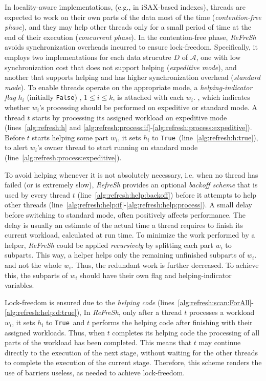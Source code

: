 \documentclass[a4paper,11pt,twoside,openany]{book}
\newcommand{\True}{\mbox{\texttt{True}}}
\newcommand{\False}{\mbox{\texttt{False}}}
\begin{document}
In locality-aware implementations, (e.g., in iSAX-based indexes), threads are expected to work
on their own parts of the data most of the time ({\em contention-free phase}), and they
may help other threads only for a small period of time at the end of their execution
({\em concurrent phase}).
In the contention-free phase, \textit{ReFreSh} avoids synchronization overheads incurred to
ensure lock-freedom. 
Specifically, it employs two implementations for each data strucutre $D$ of  $\mathcal{A}$,
one with low synchronization cost that does not support helping ({\em expeditive mode}),
and another that supports helping and has higher synchronization overhead ({\em standard mode}).  
To enable threads operate on the appropriate mode,  a {\em helping-indicator flag} $h_i$ 
(initially \False) , $1 \leq i \leq k$, is attached with each $w_i$. , which indicates whether 
$w_i$'s processing should be performed on expeditive or standard mode.
% 
A thread $t$ starts by processing its assigned workload 
on expeditive mode (lines~\ref{alg:refresh:h} and \ref{alg:refresh:process:if}-\ref{alg:refresh:process:expeditive}).
Before $t$ starts helping some part $w_i$, it sets $h_i$ to \True\ (line~\ref{alg:refresh:h:true}),
to alert $w_i$'s owner thread to start running on standard mode (line~\ref{alg:refresh:process:expeditive}).

To avoid helping whenever it is not absolutely necessary, i.e. when no thread has
failed (or is extremely slow), \textit{RefreSh} provides an optional {\em backoff scheme} that is used
by every thread $t$ (line~\ref{alg:refresh:help:backoff}) 
before it attempts to help other threads (line~\ref{alg:refresh:help:if}-\ref{alg:refresh:help:process}).
A small delay before switching to standard mode, often positively affects performance.
The delay is usually an estimate of the actual time a thread requires to finish its
current workload, calculated at run time.
% 
To minimize the work performed by a helper, \textit{ReFreSh} could
be applied  {\em recursively} by splitting each part $w_i$ to subparts. 
This way, a helper helps only the remaining unfinished subparts of $w_i$.
and not the whole $w_i$. Thus, the redundant work is further decreased. 
To achieve this, the subparts of $w_i$ should have their own flag and helping-indicator variables.

Lock-freedom is ensured due to the {\em helping code} (lines~\ref{alg:refresh:scan:ForAll}-
\ref{alg:refresh:help:d:true}), In \textit{ReFreSh}, only after a thread
$t$ processes a workload $w_i$, it sets $h_i$ to \True\, and $t$ performs 
the helping code after finishing with their assigned workloads. Thus, when $t$ completes
its helping code the processing of all parts of the workload has been completed. 
This means that $t$ may continue directly to the execution of the next stage, without
waiting for the other threads to complete the execution of the current stage. 
Therefore, this scheme renders the use of barriers useless, as needed to achieve lock-freedom. 
\end{document}
